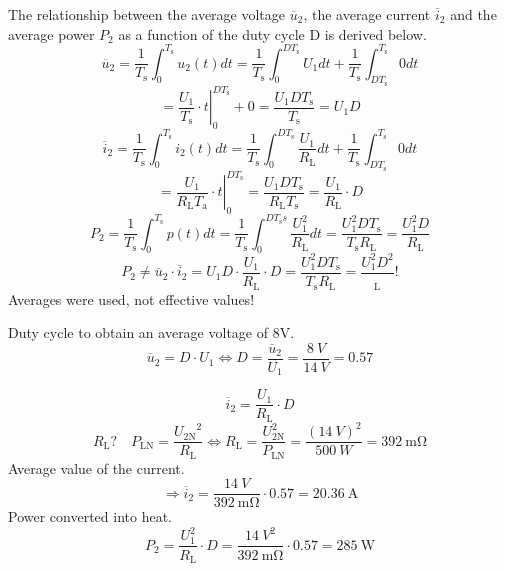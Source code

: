 \begin{solutionblock}
    The relationship between the average voltage $\overline u_2$, the average current $\overline i_2$ and the average power $P_{\mathrm{2}}$ as a function of the duty cycle D is derived below. 
    $$\overline u_2 = \frac{1}{T_{\mathrm{s}}} \int_0^{ T_{\mathrm{s}}} u_2 (t) dt = \frac{1}{ T_{\mathrm{s}}} \int_0^{D T_{\mathrm{s}}} U_1 dt + \frac{1}{ T_{\mathrm{s}}} \int_{D  T_{\mathrm{s}}}^{ T_{\mathrm{s}}} 0 dt$$
 $$= \left . \frac{U_1}{ T_{\mathrm{s}}} \cdot t \right |_0^{D  T_{\mathrm{s}}}  + 0 = \frac{U_1 D  T_{\mathrm{s}}}{ T_{\mathrm{s}}} = U_1 D$$
 $$\overline i_2 = \frac{1}{ T_{\mathrm{s}}} \int_0^{ T_{\mathrm{s}}} i_2(t) dt = \frac{1}{ T_{\mathrm{s}}}\int_0^{D  T_{\mathrm{s}}} \frac{U_1}{ R_{\mathrm{L}}} dt + \frac{1}{ T_{\mathrm{s}}}\int_{D  T_{\mathrm{s}}}^{ T_{\mathrm{s}}} 0 dt$$
 $$= \left . \frac{U_1}{ R_{\mathrm{L}}  T_{\mathrm{a}}} \cdot t \right |_0^{D  T_{\mathrm{s}}} = \frac{U_1 D  T_{\mathrm{s}}}{ R_{\mathrm{L}}  T_{\mathrm{s}}} = \frac{U_1}{ R_{\mathrm{L}}} \cdot D$$
 $$P_2 = \frac{1}{ T_{\mathrm{s}}} \int_0^{ T_{\mathrm{s}}} p(t) dt = \frac{1}{ T_{\mathrm{s}}} \int_0^{D T_{\mathrm{s}}s} \frac{U_1^2}{ R_{\mathrm{L}}} dt = \frac{U_1^2 D  T_{\mathrm{s}}}{ T_{\mathrm{s}} R_{\mathrm{L}}} = \frac{U_1^2 D}{ R_{\mathrm{L}}}$$
 $$P_2 \neq \overline u_2 \cdot \overline i_2 = U_1 D \cdot \frac{U_1}{ R_{\mathrm{L}}} \cdot D = \frac{U_1^2 D T_{\mathrm{s}}}{ T_{\mathrm{s}}  R_{\mathrm{L}}} = \frac{U_1^2 D^2}{ _{\mathrm{L}}} !$$
 Averages were used, not effective values!
\end{solutionblock}


\begin {solutionblock}
Duty cycle to obtain an average voltage of 8V.
    $$\overline u_2 = D \cdot U_1 \Leftrightarrow D = \frac{\overline u_2}{U_1} = \frac{8\ \si{V}}{14 \ \si{V}}=0.57$$
    
   $$\overline i_2 = \frac{U_1}{ R_{\mathrm{L}}} \cdot D$$
 $$ R_{\mathrm{L}}? \quad  P_{\mathrm{LN}} = \frac{{ U_{\mathrm{2N}}}^2}{ R_{\mathrm{L}}} 
 \Leftrightarrow  R_{\mathrm{L}} = \frac{ U_{\mathrm{2N}}^2}{ P_{\mathrm{LN}}} = \frac{(14\ \si{V})^2}{500\ \si{W}} = \SI{392}{\mohm}$$%
 Average value of the current.
 $$\Rightarrow \overline i_2 = \frac{14\ \si{V}}{392\ \si{\mohm}} \cdot 0.57 =  \SI{20.36}{\ampere}$$
 Power converted into heat.
 $$P_2 = \frac{U_1^2}{ R_{\mathrm{L}}} \cdot D = \frac{14\ \si{V}^2}{392\ \si{\mohm}} \cdot 0.57 = \SI{285}{\watt}$$
\end{solutionblock}
	
